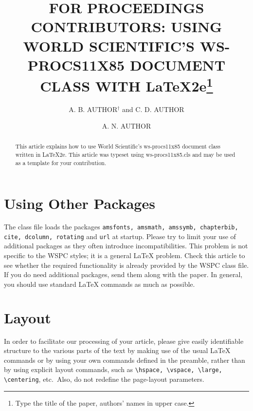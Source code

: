 \documentclass{ws-procs11x85}
\begin{document}
\title{FOR PROCEEDINGS CONTRIBUTORS: USING WORLD SCIENTIFIC'S WS-PROCS11X85 DOCUMENT CLASS WITH \LaTeX2e\footnote{Type the title of the paper, authors' names in upper case.}}

\author{A. B. AUTHOR$^\dag$ and C. D. AUTHOR}

\address{University Department, University Name,\\
City, State ZIP/Zone, Country\\
$^\dag$E-mail: ab\_author@university.com\\
www.university\_name.edu}

\author{A. N. AUTHOR}

\address{Group, Laboratory, Street,\\
City, State ZIP/Zone, Country\\
E-mail: an\_author@laboratory.com}

\begin{abstract}
This article explains how to use World Scientific's ws-procs11x85
document class written in \LaTeX2e. This article was typeset using
ws-procs11x85.cls and may be used as a template for your contribution.
\end{abstract}


\bodymatter

\section{Using Other Packages}\label{aba:sec1}
The class file loads the packages {\tt amsfonts, amsmath, amssymb,
chapterbib, cite, dcolumn, rotating} and {\tt url} at
startup. Please try to limit your use of additional packages as they
often introduce incompatibilities. This problem is not specific to
the WSPC styles; it is a general \LaTeX{} problem. Check this
article to see whether the required functionality is already
provided by the WSPC class file. If you do need additional packages,
send them along with the paper. In general, you should use standard
\LaTeX{} commands as much as possible.

\section{Layout}
In order to facilitate our processing of your article, please give
easily identifiable structure to the various parts of the text by
making use of the usual \LaTeX{} commands or by using your own commands
defined in the preamble, rather than by using explicit layout
commands, such as \verb|\hspace, \vspace, \large, \centering|,
etc.~Also, do not redefine the page-layout parameters.
\end{document}
